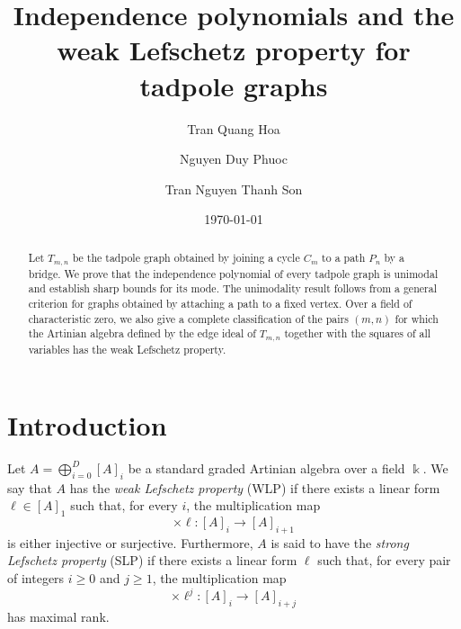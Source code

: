 \documentclass[12pt,twoside]{amsart}
\theoremstyle{definition}
\theoremstyle{mystyle}
\begin{document}
\title[Independence polynomials and WLP for tadpole graphs]
{Independence polynomials and the weak Lefschetz property for tadpole graphs}

\author[T.Q. Hoa]{Tran Quang Hoa}
\address{University of Education, Hue University,  34 Le Loi St., Hue City, Vietnam.}

\author[N.D. Phuoc]{Nguyen Duy Phuoc}
\address{University of Education, Hue University, 34 Le Loi St., Hue City, Vietnam}

\author[T.N.T. Son]{Tran Nguyen Thanh Son}
\address{University of Education, Hue University, 34 Le Loi St., Hue City, Vietnam}

\date{\today}

\begin{abstract}
	Let $T_{m,n}$ be the tadpole graph obtained by joining a cycle
	$C_m$ to a path $P_n$ by a bridge. We prove that the independence
	polynomial of every tadpole graph is unimodal and establish
	sharp bounds for its mode. The unimodality
	result follows from a general criterion for graphs obtained
	by attaching a path to a fixed vertex. Over a field of
	characteristic zero, we also give a complete classification
	of the pairs $(m,n)$ for which the Artinian algebra defined
	by the edge ideal of $T_{m,n}$ together with the squares of
	all variables has the weak Lefschetz property.
\end{abstract}



\makeatletter
{}
\makeatother


\maketitle
\section{Introduction}
Let \(A=\bigoplus_{i=0}^{D}[A]_i\) be a standard graded Artinian algebra over a field \(\Bbbk\). We say that \(A\) has the \emph{weak Lefschetz property} (WLP) if there exists a linear form \(\ell\in[A]_1\) such that, for every \(i\), the multiplication map
\[
\times\ell:[A]_i\longrightarrow[A]_{i+1}
\]
is either injective or surjective. Furthermore, \(A\) is said to have the \emph{strong Lefschetz property} (SLP) if there exists a linear form \(\ell\) such that, for every pair of integers \(i\geq 0\) and \(j\geq 1\), the multiplication map
\[
\times\ell^j:[A]_i\longrightarrow[A]_{i+j}
\]
has maximal rank.
\end{document}
